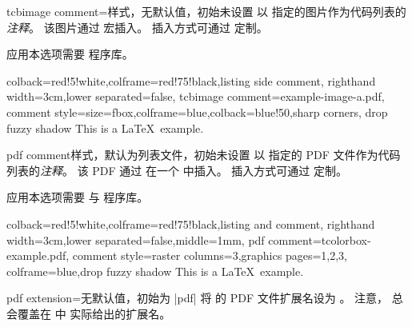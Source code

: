 \clearpage
\begin{docTcbKey}[][doc new=2014-11-14]{tcbimage comment}{=}{样式，无默认值，初始未设置}
  以  指定的图片作为代码列表的\textit{注释}。
  该图片通过  宏插入。
  插入方式可通过  定制。
  \begin{marker}
  应用本选项需要  程序库。
  \end{marker}
  \medskip
\begin{dispExample}
\begin{tcblisting}{colback=red!5!white,colframe=red!75!black,listing side comment,
  righthand width=3cm,lower separated=false,
  tcbimage comment={example-image-a.pdf},
  comment style={size=fbox,colframe=blue,colback=blue!50,sharp corners,
    drop fuzzy shadow}}
This is a \LaTeX\ example.
\end{tcblisting}
\end{dispExample}
\end{docTcbKey}

\clearpage

\begin{docTcbKey}[][doc new=2014-11-14]{pdf comment}{}{样式，默认为列表文件，初始未设置}
  以  指定的 PDF 文件作为代码列表的\textit{注释}。
  该 PDF 通过  在一个  中插入。
  插入方式可通过  定制。
  \begin{marker}
  应用本选项需要  与  程序库。
  \end{marker}
  \medskip
\begin{dispExample}
\begin{tcblisting}{colback=red!5!white,colframe=red!75!black,listing and comment,
  righthand width=3cm,lower separated=false,middle=1mm,
  pdf comment={tcolorbox-example.pdf},
  comment style={raster columns=3,graphics pages={1,2,3},
    colframe=blue,drop fuzzy shadow}}
This is a \LaTeX\ example.
\end{tcblisting}
\end{dispExample}
\end{docTcbKey}

\clearpage


\begin{docTcbKey}[][doc new=2014-11-14]{pdf extension}{=}{无默认值，初始为 |pdf|}
  将  的 PDF 文件扩展名设为 。
  注意， 总会覆盖在  中
  实际给出的扩展名。
\end{docTcbKey}


